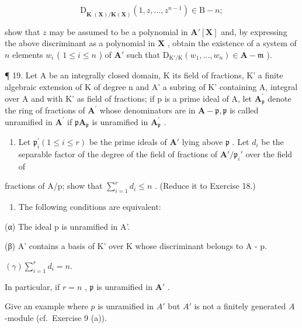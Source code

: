 \[
\mathrm{D} _ {\mathbf {K} ^ {\prime} (\mathbf {X}) / \mathbf {K} (\mathbf {X})} (1, z, \dots , z ^ {n - 1}) \in \mathrm{B} - n;
\]

show that \(z\) may be assumed to be a polynomial in \(\mathbf{A}'[\mathbf{X}]\) and, by expressing the above discriminant as a polynomial in \(\mathbf{X}\) , obtain the existence of a system of \(n\) elements \(w_{i}\) ( \(1 \leqslant i \leqslant n\) ) of \(\mathbf{A}'\) such that \(\mathrm{D}_{\mathrm{K}'/\mathrm{K}}(w_1, \ldots, w_n) \in \mathbf{A} - \mathfrak{m}\) ).

¶ 19. Let A be an integrally closed domain, K its field of fractions, K' a finite algebraic extension of K of degree n and A' a subring of K' containing A, integral over A and with K' as field of fractions; if p is a prime ideal of A, let \(\mathbf{A}_{\mathfrak{p}}^{\prime}\) denote the ring of fractions of \(\mathbf{A}^{\prime}\) whose denominators are in \(\mathbf{A}-\mathfrak{p},\mathfrak{p}\) is called unramified in \(\mathbf{A}^{\prime}\) if \(\mathfrak{p}\mathbf{A}_{\mathfrak{p}}\) is unramified in \(\mathbf{A}_{\mathfrak{p}}^{\prime}\) .

\begin{enumerate}
\def\labelenumi{(\alph{enumi})}
\tightlist
\item
  Let \(\mathfrak{p}_i^{\prime}(1\leqslant i\leqslant r)\) be the prime ideals of \(\mathbf{A}'\) lying above \(\mathfrak{p}\) . Let \(d_{i}\) be the separable factor of the degree of the field of fractions of \(\mathbf{A}' / \mathfrak{p}_i'\) over the field of
\end{enumerate}

fractions of A/p; show that \(\sum_{i=1}^{r} d_i \leqslant n\) . (Reduce it to Exercise 18.)

\begin{enumerate}
\def\labelenumi{(\alph{enumi})}
\setcounter{enumi}{1}
\tightlist
\item
  The following conditions are equivalent:
\end{enumerate}

(α) The ideal p is unramified in A'.

(β) A' contains a basis of K' over K whose discriminant belongs to A - p.

\((\gamma)\sum_{i=1}^{r}d_{i}=n.\)

In particular, if \(r = n\) , \(\mathfrak{p}\) is unramified in \(\mathbf{A}'\) .

Give an example where \(p\) is unramified in \(A'\) but \(A'\) is not a finitely generated \(A\) -module (cf.~Exercise 9 (a)).

